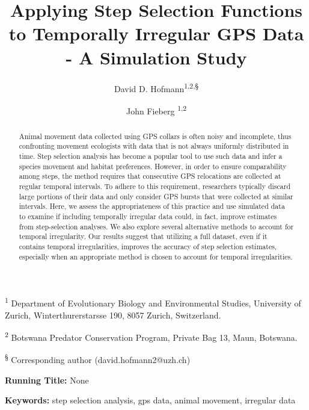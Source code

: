 \documentclass[abstract=on,10pt,a4paper,bibliography=totocnumbered]{article}
\title{Applying Step Selection Functions to Temporally Irregular GPS Data - A
Simulation Study}
\author{
  David D. Hofmann\textsuperscript{1,2,\S} \orcid{0000-0003-3477-4365} \and
  John Fieberg \textsuperscript{1,2} \orcid{0000-0002-3180-7021}
}
\begin{document}



\maketitle

\begin{flushleft}

\vspace{0.5cm}

\textsuperscript{1} Department of Evolutionary Biology and Environmental
Studies, University of Zurich, Winterthurerstarsse 190, 8057 Zurich,
Switzerland.

\textsuperscript{2} Botswana Predator Conservation Program, Private Bag 13,
Maun, Botswana.

\textsuperscript{\S} Corresponding author (david.hofmann2@uzh.ch)

\vspace{4cm}

\textbf{Running Title:} None

\vspace{0.5cm}

\textbf{Keywords:} step selection analysis, gps data, animal movement, irregular
data

\end{flushleft}

\newpage
\begin{abstract}
Animal movement data collected using GPS collars is often noisy and incomplete,
thus confronting movement ecologists with data that is not always uniformly
distributed in time. Step selection analysis has become a popular tool to use
such data and infer a species movement and habitat preferences. However, in
order to ensure comparability among steps, the method requires that consecutive
GPS relocations are collected at regular temporal intervals. To adhere to this
requirement, researchers typically discard large portions of their data and only
consider GPS bursts that were collected at similar intervals. Here, we assess
the appropriateness of this practice and use simulated data to examine if
including temporally irregular data could, in fact, improve estimates from
step-selection analyses. We also explore several alternative methods to account
for temporal irregularity. Our results suggest that utilizing a full dataset,
even if it contains temporal irregularities, improves the accuracy of step
selection estimates, especially when an appropriate method is chosen to account
for temporal irregularities.
\end{abstract}
\end{document}
